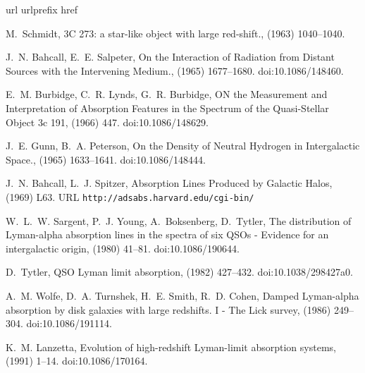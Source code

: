 \documentclass[12pt]{elsarticle}
\begin{document}
\begin{thebibliography}{10}
\expandafter\ifx\csname url\endcsname\relax
  \def\url#1{\texttt{#1}}\fi
\expandafter\ifx\csname urlprefix\endcsname\relax\def\urlprefix{URL }\fi
\expandafter\ifx\csname href\endcsname\relax
  \def\href#1#2{#2} \def\path#1{#1}\fi

M.~{Schmidt}, {3C 273: a star-like object with large red-shift.}, 
  (1963) 1040--1040.

J.~N. {Bahcall}, E.~E. {Salpeter}, {On the Interaction of Radiation from
  Distant Sources with the Intervening Medium.},  (1965) 1677--1680.
\newblock \href {http://dx.doi.org/10.1086/148460} {\path{doi:10.1086/148460}}.

E.~M. {Burbidge}, C.~R. {Lynds}, G.~R. {Burbidge}, {ON the Measurement and
  Interpretation of Absorption Features in the Spectrum of the Quasi-Stellar
  Object 3c 191},  (1966) 447.
\newblock \href {http://dx.doi.org/10.1086/148629} {\path{doi:10.1086/148629}}.

J.~E. {Gunn}, B.~A. {Peterson}, {On the Density of Neutral Hydrogen in
  Intergalactic Space.},  (1965) 1633--1641.
\newblock \href {http://dx.doi.org/10.1086/148444} {\path{doi:10.1086/148444}}.

J.~N. {Bahcall}, L.~J. {Spitzer},
  \href{http://adsabs.harvard.edu/cgi-bin/}{{Absorption Lines Produced by
  Galactic Halos}},  (1969) L63.
\newline\urlprefix\url{http://adsabs.harvard.edu/cgi-bin/}

W.~L.~W. {Sargent}, P.~J. {Young}, A.~{Boksenberg}, D.~{Tytler}, {The
  distribution of Lyman-alpha absorption lines in the spectra of six QSOs -
  Evidence for an intergalactic origin},  (1980) 41--81.
\newblock \href {http://dx.doi.org/10.1086/190644} {\path{doi:10.1086/190644}}.

D.~{Tytler}, {QSO Lyman limit absorption},  (1982) 427--432.
\newblock \href {http://dx.doi.org/10.1038/298427a0}
  {\path{doi:10.1038/298427a0}}.

A.~M. {Wolfe}, D.~A. {Turnshek}, H.~E. {Smith}, R.~D. {Cohen}, {Damped
  Lyman-alpha absorption by disk galaxies with large redshifts. I - The Lick
  survey},  (1986) 249--304.
\newblock \href {http://dx.doi.org/10.1086/191114} {\path{doi:10.1086/191114}}.

K.~M. {Lanzetta}, {Evolution of high-redshift Lyman-limit absorption systems},
   (1991) 1--14.
\newblock \href {http://dx.doi.org/10.1086/170164} {\path{doi:10.1086/170164}}.


\end{thebibliography}
\end{document}
